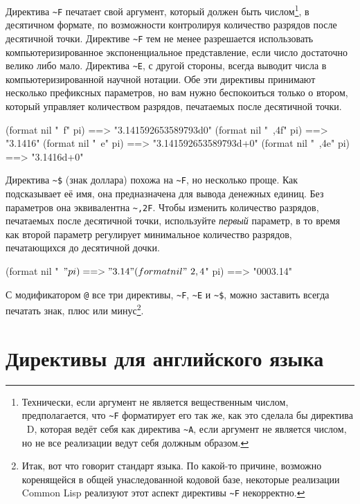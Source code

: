 Директива \lstinline!~F! печатает свой аргумент, который должен быть
числом\footnote{Технически, если аргумент не является вещественным числом, предполагается,
  что \lstinline!~F! форматирует его так же, как это сделала бы директива ~D, которая
  ведёт себя как директива \lstinline!~A!, если аргумент не является числом, но не все
  реализации ведут себя должным образом.}, в десятичном формате, по возможности
контролируя количество разрядов после десятичной точки. Директиве \lstinline!~F! тем не
менее разрешается использовать компьютеризированное экспоненциальное представление, если
число достаточно велико либо мало. Директива \lstinline!~E!, с другой стороны, всегда
выводит числа в компьютеризированной научной нотации. Обе эти директивы принимают
несколько префиксных параметров, но вам нужно беспокоиться только о втором, который
управляет количеством разрядов, печатаемых после десятичной точки.

\begin{myverb}
(format nil "~f" pi)   ==> "3.141592653589793d0"
(format nil "~,4f" pi) ==> "3.1416"
(format nil "~e" pi)   ==> "3.141592653589793d+0"
(format nil "~,4e" pi) ==> "3.1416d+0"
\end{myverb}

Директива \lstinline!~$! (знак доллара) похожа на \lstinline!~F!, но несколько
проще. Как подсказывает её имя, она предназначена для вывода денежных единиц. Без
параметров она эквивалентна \lstinline!~,2F!. Чтобы изменить количество разрядов,
печатаемых после десятичной точки, используйте \textit{первый} параметр, в то время как
второй параметр регулирует минимальное количество разрядов, печатающихся до десятичной
дочки.%

\begin{myverb}
(format nil "~$" pi) ==> "3.14"
(format nil "~2,4$" pi) ==> "0003.14"
\end{myverb}

С модификатором \lstinline!@! все три директивы, \lstinline!~F!, \lstinline!~E! и
\lstinline!~$!, можно заставить всегда печатать знак, плюс или минус\footnote{Итак, вот
  что говорит стандарт языка. По какой-то причине, возможно коренящейся в общей
  унаследованной кодовой базе, некоторые реализации Common Lisp реализуют этот аспект
  директивы \lstinline!~F! некорректно.}. %

\section{Директивы для английского языка}
\label{ch18:eng-lang}

